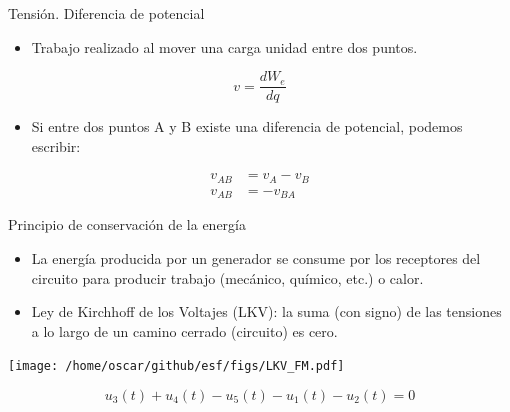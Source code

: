 \documentclass[xcolor={usenames,svgnames,dvipsnames}]{beamer}
\begin{document}
\begin{frame}[label={sec:orgbee1557}]{Tensión. Diferencia de potencial}
\begin{itemize}
\item \alert{Trabajo realizado al mover una carga unidad entre dos puntos}.
\end{itemize}

\[
v=\frac{dW_{e}}{dq}
\]

\begin{itemize}
\item Si entre dos puntos A y B existe una diferencia de potencial, podemos
escribir:
\end{itemize}
\begin{align*}
         v_{AB} &=  v_{A}-v_{B}\\
         v_{AB} &=  -v_{BA}
\end{align*}
\end{frame}

\begin{frame}[label={sec:orgc7427bc}]{Principio de conservación de la energía}
\begin{itemize}
\item La energía producida por un generador se consume por los receptores
del circuito para producir trabajo (mecánico, químico, etc.) o
calor.

\item \alert{Ley de Kirchhoff de los Voltajes (LKV)}: la suma (con signo) de las
tensiones a lo largo de un camino cerrado (circuito) es cero.
\end{itemize}

\begin{center}
\texttt{[image: /home/oscar/github/esf/figs/LKV\_FM.pdf]}
\end{center}

\[
u_3(t) + u_4 (t) - u_5 (t) - u_1 (t) - u_2 (t)  = 0
\]
\end{frame}
\end{document}
